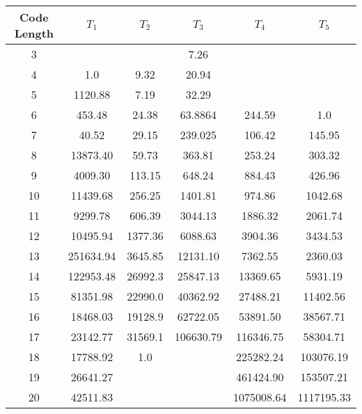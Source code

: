 \documentclass[12pt]{ociamthesis}  %
\newcommand{\ra}[1]{\renewcommand{\arraystretch}{#1}}
\begin{document}
\begin{table*} \centering
\ra{1.3}
\begin{tabular}{@{}cccccc@{}}\toprule
Code Length & $T_1$ & $T_2$ & $T_3$ & $T_4$ & $T_5$ \\ \midrule
 3 	&           	  &         	   &  7.26        		 &                 		&                	\\
 4 	&  1.0      	  & 9.32    	   &  20.94       		 &                 		&                	\\
 5 	&  1120.88  	  & 7.19    	   &  32.29       		 &                 		&                	\\
 6 	&  453.48   	  & 24.38   	   &  63.8864     		 &   244.59        		&   1.0          	\\
 7 	&  40.52    	  & 29.15   	   &  239.025     		 &   106.42        		&   145.95       	\\
 8 	&  13873.40 	  & 59.73   	   &  363.81      		 &   253.24        		&   303.32       	\\
 9 	&  4009.30  	  & 113.15  	   &  648.24      		 &   884.43        		&   426.96       	\\
 10	&  11439.68 	  & 256.25  	   &  1401.81     		 &   974.86        		&   1042.68      	\\
 11	&  9299.78  	  & 606.39  	   &  3044.13     		 &   1886.32       		&   2061.74      	\\
 12	&  10495.94 	  & 1377.36 	   &  6088.63     		 &   3904.36       		&   3434.53      	\\
 13	&  251634.94	  & 3645.85 	   &  12131.10    		 &   7362.55       		&   2360.03      	\\
 14	&  122953.48	  & 26992.3 	   &  25847.13    		 &   13369.65      		&   5931.19      	\\
 15	&  81351.98 	  & 22990.0 	   &  40362.92    		 &   27488.21      		&   11402.56     	\\
 16	&  18468.03 	  & 19128.9 	   &  62722.05    		 &   53891.50      		&   38567.71     	\\
 17	&  23142.77 	  & 31569.1 	   &  106630.79   		 &   116346.75     		&   58304.71     	\\
 18	&  17788.92 	  & 1.0     	   &              		 &   225282.24     		&   103076.19    	\\
 19	&  26641.27 	  &         	   &              		 &   461424.90     		&   153507.21    	\\
 20	&  42511.83 	  &         	   &              		 &   1075008.64    		&   1117195.33   	\\

\end{tabular}
\end{table*}
\end{document}
